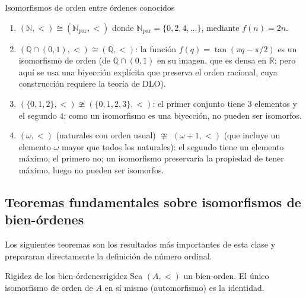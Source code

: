 \begin{ejemplo}{Isomorfismos de orden entre órdenes conocidos}{}
\begin{enumerate}[leftmargin=2em, label=(\alph*)]
  \item $(\mathbb{N}, <) \cong (\mathbb{N}_{\text{par}}, <)$ donde $\mathbb{N}_{\text{par}} = \{0, 2, 4, \ldots\}$, mediante $f(n) = 2n$.

  \item $(\mathbb{Q} \cap (0,1), <) \cong (\mathbb{Q}, <)$: la función $f(q) = \tan(\pi q - \pi/2)$ es un isomorfismo de orden (de $\mathbb{Q} \cap (0,1)$ en su imagen, que es densa en $\mathbb{R}$; pero aquí se usa una biyección explícita que preserva el orden racional, cuya construcción requiere la teoría de DLO).

  \item $(\{0,1,2\}, <) \ncong (\{0,1,2,3\}, <)$: el primer conjunto tiene $3$ elementos y el segundo $4$; como un isomorfismo es una biyección, no pueden ser isomorfos.

  \item $(\omega, <)$ (naturales con orden usual) $\ncong$ $(\omega + 1, <)$ (que incluye un elemento $\omega$ mayor que todos los naturales): el segundo tiene un elemento máximo, el primero no; un isomorfismo preservaría la propiedad de tener máximo, luego no pueden ser isomorfos.
\end{enumerate}
\end{ejemplo}

\subsection{Teoremas fundamentales sobre isomorfismos de bien-órdenes}

Los siguientes teoremas son los resultados más importantes de esta clase y prepararan directamente la definición de número ordinal.

\begin{teorema}{Rigidez de los bien-órdenes}{rigidez}
Sea $(A, <)$ un bien-orden. El único isomorfismo de orden de $A$ en sí mismo (automorfismo) es la identidad.
\end{teorema}

